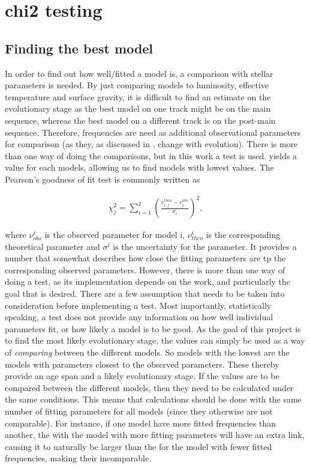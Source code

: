 \section{chi2 testing}
\label{sec:chis}

\subsection{Finding the best model}
\label{bestmodel}


In order to find out how well/fitted a model is, a comparison with stellar parameters is needed. By just comparing models to luminosity, effective temperature and surface gravity, it is difficult to find an estimate on the evolutionary stage as the best model on one track might be on the main sequence, whereas the best model on a different track is on the post-main sequence. Therefore, frequencies are need as additional observational parameters for comparison (as they, as discussed in , change with evolution). There is more than one way of doing the comparisons, but in this work a \chis test is used. \chis yields a value for each models, allowing us to find models with lowest \chis values. The Pearson's goodness of fit test is commonly written as 

\begin{align}
\label{standard_chi}
\chi^2_j = \sum^I_{i=1}\left(\frac{v^{theo}_{i,j}-v^{obs}_i}{\sigma_i}\right)^2,
\end{align}

\noindent where $\nu^i_{obs}$ is the observed parameter for model i, $\nu^i_{theo}$ is the corresponding theoretical parameter and $\sigma^i$ is the uncertainty for the parameter. It provides a number that somewhat describes how close the fitting parameters are tp the corresponding observed parameters. However, there is more than one way of doing a \chis test, as its implementation depends on the work, and particularly the goal that is desired. There are a few assumption that needs to be taken into consideration before implementing a \chis test. Most importantly, statistically speaking, a \chis test does not provide any information on how well individual parameters fit, or how likely a model is to be good. As the goal of this project is to find the most likely evolutionary stage, the \chis values can simply be used as a way of \textit{comparing} between the different models. So models with the lowest \chis are the models with parameters closest to the observed parameters. These thereby provide an age span and a likely evolutionary stage. 
If the \chis values are to be compared between the different models, then they need to be calculated under the same conditions. This means that calculations should be done with the same number of fitting parameters for all models (since they otherwise are not comparable). For instance, if one model have more fitted frequencies than another, the \chis with the model with more fitting parameters will have an extra link, causing it to naturally be larger than the \chis for the model with fewer fitted frequencies, making their \chis incomparable. 

